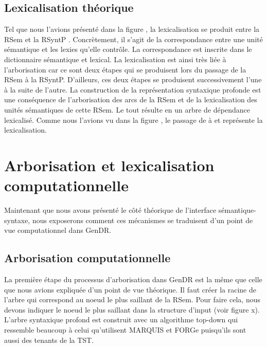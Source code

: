 \subsection{Lexicalisation théorique}
Tel que nous l'avions présenté dans la figure , la lexicalisation se produit entre la RSem et la RSyntP \citep{PolguereStructurationmisejeu1990}. Concrètement, il s'agit de la correspondance entre une unité sémantique et les lexies qu'elle contrôle. La correspondance est inscrite dans le dictionnaire sémantique et lexical. La lexicalisation est ainsi très liée à l'arborisation car ce sont deux étapes qui se produisent lors du passage de la RSem à la RSyntP. D'ailleurs, ces deux étapes se produisent successivement l'une à la suite de l'autre. La construction de la représentation syntaxique profonde est une conséquence de l'arborisation des arcs de la RSem et de la lexicalisation des unités sémantiques de cette RSem. Le tout résulte en un arbre de dépendance lexicalisé. Comme nous l'avions vu dans la figure , le passage de  à  et  représente la lexicalisation.


\section{Arborisation et lexicalisation computationnelle}\label{secarbolex}

Maintenant que nous avons présenté le côté théorique de l'interface sémantique-syntaxe, nous exposerons comment ces mécanismes se traduisent d'un point de vue computationnel dans GenDR.

\subsection{Arborisation computationnelle}
La première étape du processus d'arborisation dans GenDR est la même que celle que nous avions expliquée d'un point de vue théorique. Il faut créer la racine de l'arbre qui correspond au noeud le plus saillant de la RSem. Pour faire cela, nous devons indiquer le noeud le plus saillant dans la structure d'input (voir figure x). L'arbre syntaxique profond est construit avec un algorithme top-down qui ressemble beaucoup à celui qu'utilisent MARQUIS et FORGe puisqu'ils sont aussi des tenants de la TST. 

